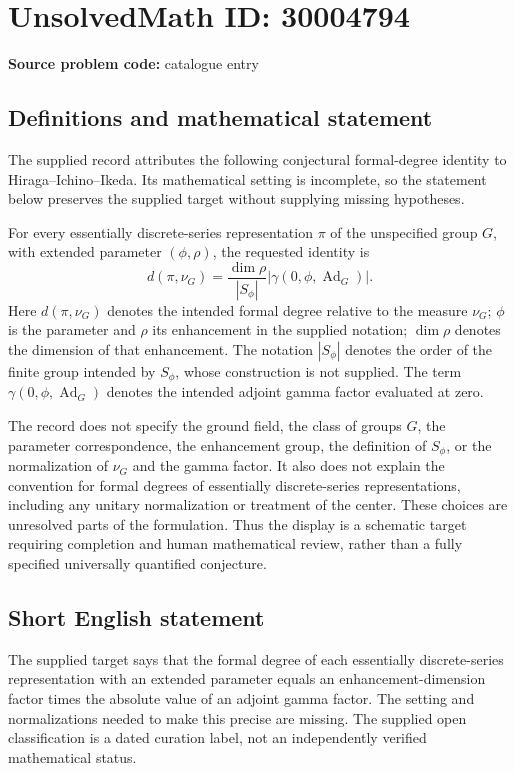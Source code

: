 \documentclass[11pt]{article}
\begin{document}
\section*{UnsolvedMath ID: 30004794}
\textbf{Source problem code:} catalogue entry
\subsection{Definitions and mathematical statement}
The supplied record attributes the following conjectural formal-degree identity to Hiraga--Ichino--Ikeda. Its mathematical setting is incomplete, so the statement below preserves the supplied target without supplying missing hypotheses.

For every essentially discrete-series representation $\pi$ of the unspecified group $G$, with extended parameter $(\phi,\rho)$, the requested identity is
\[
 d(\pi,\nu_G)
 =\frac{\dim\rho}{|S_\phi|}
 \left|\gamma(0,\phi,\operatorname{Ad}_G)\right|.
\]
Here $d(\pi,\nu_G)$ denotes the intended formal degree relative to the measure $\nu_G$; $\phi$ is the parameter and $\rho$ its enhancement in the supplied notation; $\dim\rho$ denotes the dimension of that enhancement. The notation $|S_\phi|$ denotes the order of the finite group intended by $S_\phi$, whose construction is not supplied. The term $\gamma(0,\phi,\operatorname{Ad}_G)$ denotes the intended adjoint gamma factor evaluated at zero.

The record does not specify the ground field, the class of groups $G$, the parameter correspondence, the enhancement group, the definition of $S_\phi$, or the normalization of $\nu_G$ and the gamma factor. It also does not explain the convention for formal degrees of essentially discrete-series representations, including any unitary normalization or treatment of the center. These choices are unresolved parts of the formulation. Thus the display is a schematic target requiring completion and human mathematical review, rather than a fully specified universally quantified conjecture.
\subsection{Short English statement}
The supplied target says that the formal degree of each essentially discrete-series representation with an extended parameter equals an enhancement-dimension factor times the absolute value of an adjoint gamma factor. The setting and normalizations needed to make this precise are missing. The supplied open classification is a dated curation label, not an independently verified mathematical status.
\end{document}
